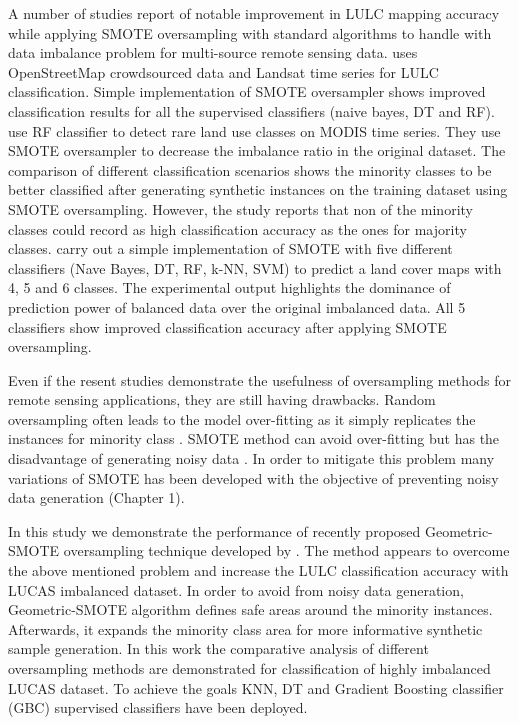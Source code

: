 \documentclass[parskip=full]{scrartcl}
\begin{document}
A number of studies report of notable improvement in LULC mapping accuracy
while applying SMOTE oversampling with standard algorithms to handle with data
imbalance problem for multi-source remote sensing data. \cite{Johnson2016}
uses OpenStreetMap crowdsourced data and Landsat time series for LULC
classification. Simple implementation of SMOTE oversampler shows improved
classification results for all the supervised classifiers (naive bayes, DT and
RF). \cite{Bogner2018} use RF classifier to detect rare land use classes on
MODIS time series. They use SMOTE oversampler to decrease the imbalance ratio
in the original dataset. The comparison of different classification scenarios
shows the minority classes to be better classified after generating synthetic
instances on the training dataset using SMOTE oversampling. However, the study
reports that non of the minority classes could record as high classification
accuracy as the ones for majority classes. \cite{Panda2018} carry out a simple
implementation of SMOTE with five different classifiers (Nave Bayes, DT, RF,
k-NN, SVM) to predict a land cover maps with 4, 5 and 6 classes. The
experimental output highlights the dominance of prediction power of balanced
data over the original imbalanced data. All 5 classifiers show improved
classification accuracy after applying SMOTE oversampling.

Even if the resent studies demonstrate the usefulness of oversampling methods
for remote sensing applications, they are still having drawbacks. Random
oversampling often leads to the model over-fitting as it simply replicates the
instances for minority class \cite{Feng2019}. SMOTE method can avoid
over-fitting but has the disadvantage of generating noisy data \cite{He2008}.
In order to mitigate this problem many variations of SMOTE has been developed
with the objective of preventing noisy data generation (Chapter 1).

In this study we demonstrate the performance of recently proposed
Geometric-SMOTE oversampling technique developed by \cite{Douzas2019}. The
method appears to overcome the above mentioned problem and increase the LULC
classification accuracy with LUCAS imbalanced dataset. In order to avoid from
noisy data generation, Geometric-SMOTE algorithm defines safe areas around the
minority instances. Afterwards, it expands the minority class area for more
informative synthetic sample generation. In this work the comparative analysis
of different oversampling methods are demonstrated for classification of highly
imbalanced LUCAS dataset. To achieve the goals KNN, DT and Gradient Boosting
classifier (GBC) supervised classifiers have been deployed.
\end{document}
